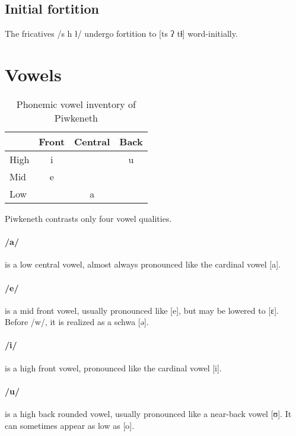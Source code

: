 \documentclass[executivepaper,10pt,twoside,openany,draft]{memoir}
\newcommand{\lang}{Piwkeneth}
\newcommand{\bind}{\symbol{"0361}}
\begin{document}

\subsection{Initial fortition} \label{initfort}

The fricatives /s h ł/ undergo fortition to [t\bind{}s ʔ t\bind{}ɬ] word-initially.


\section{Vowels}

\begin{table}[ht]
    \centering
    \begin{tabular}{lccc}
        \toprule
        & Front & Central & Back \\
        \midrule
        High & i & & u \\
        Mid & e & &  \\
        Low & & a & \\
        \bottomrule
    \end{tabular}
    \caption{Phonemic vowel inventory of \lang}
\end{table}

\lang{} contrasts only four vowel qualities. 

\paragraph{/a/} is a low central vowel, almost always pronounced like the cardinal vowel [a].

\paragraph{/e/} is a mid front vowel, usually pronounced like [e], but may be lowered to [ɛ]. Before /w/, it is realized as a schwa [ə].

\paragraph{/i/} is a high front vowel, pronounced like the cardinal vowel [i].

\paragraph{/u/} is a high back rounded vowel, usually pronounced like a near-back vowel [ʊ]. It can sometimes appear as low as [o].
\end{document}
